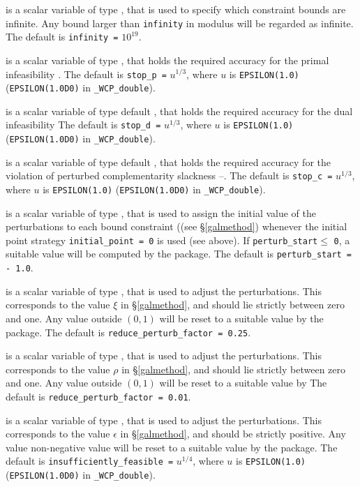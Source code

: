 \documentclass{galahad}
\newcommand{\packagename}{WCP}
\newcommand{\fullpackagename}{\libraryname\_\-\packagename}
\begin{document}
\begin{description}
 is a scalar variable of type \realdp, that is used to
specify which constraint bounds are infinite.
Any bound larger than {\tt infinity} in modulus will be regarded as infinite.
The default is {\tt infinity =} $10^{19}$.

 is a scalar variable of type \realdp, that holds the
required accuracy for the primal infeasibility .
The default is {\tt stop\_p =} $u^{1/3}$,
where $u$ is {\tt EPSILON(1.0)} ({\tt EPSILON(1.0D0)} in 
{\tt \fullpackagename\_double}).

 is a scalar variable of type default 
\realdp, that holds the
required accuracy for the dual infeasibility 
The default is {\tt stop\_d =} $u^{1/3}$,
where $u$ is {\tt EPSILON(1.0)} ({\tt EPSILON(1.0D0)} in 
{\tt \fullpackagename\_double}).

 is a scalar variable of type default 
\realdp, that holds the
required accuracy for the violation of perturbed complementarity slackness 
--.
The default is {\tt stop\_c =} $u^{1/3}$,
where $u$ is {\tt EPSILON(1.0)} ({\tt EPSILON(1.0D0)} in 
{\tt \fullpackagename\_double}).

 is a scalar variable of type \realdp, 
that is used to assign the initial value of the perturbations
to each bound constraint ((see \S\ref{galmethod}) 
whenever the initial point strategy {\tt initial\_point = 0} is used (see above).
If {\tt perturb\_start}$\leq$ {\tt 0}, a suitable value will be
computed by the package. The default is {\tt perturb\_start = - 1.0}.

 is a scalar variable of type \realdp, 
that is used to adjust the perturbations. This corresponds to the
value $\xi$ in \S\ref{galmethod}, and should lie strictly between zero and
one. Any value outside $(0,1)$ will be reset to a suitable value by
the package. The default is {\tt reduce\_perturb\_factor = 0.25}.

 is a scalar variable of type \realdp, 
that is used to adjust the perturbations. This corresponds to the
value $\rho$ in \S\ref{galmethod}, and should lie strictly between zero and
one. Any value outside $(0,1)$ will be reset to a suitable value by
The default is {\tt reduce\_perturb\_factor = 0.01}.

 is a scalar variable of type \realdp, 
that is used to adjust the perturbations. This corresponds to the
value $\epsilon$ in \S\ref{galmethod}, and should be strictly positive.
Any value non-negative value will be reset to a suitable value by the package.
The default is {\tt insufficiently\_fe\-asible =} $u^{1/4}$,
where $u$ is {\tt EPSILON(1.0)} ({\tt EPSILON(1.0D0)} in 
{\tt \fullpackagename\_double}).


\end{description}
\end{document}
